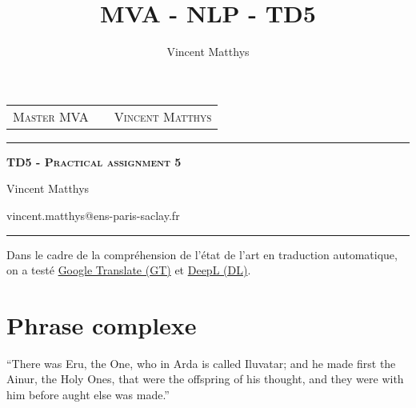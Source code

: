 \documentclass[12pt,a4paper,onecolumn]{article}
\title{MVA - NLP - TD5}
\author{Vincent Matthys}
\begin{document}
\begin{tabularx}{0.9\textwidth}{@{} l X r @{} }
	{\textsc{Master MVA}}  &  & \textsc{Vincent Matthys} \\
\end{tabularx}
\begin{center}

	\rule[11pt]{5cm}{0.5pt}

	\textbf{\LARGE \textsc{TD5 - Practical assignment 5}}

	Vincent Matthys

	vincent.matthys@ens-paris-saclay.fr

	\rule{5cm}{0.5pt}

\end{center}


Dans le cadre de la compréhension de l'état de l'art en traduction automatique, on a testé \href{https://translate.google.fr/m/translate}{Google Translate (GT)} et \href{https://www.deepl.com/translator}{DeepL (DL)}.

\section{Phrase complexe}

\enquote{There was Eru, the One, who in Arda is called Iluvatar; and he made first the Ainur, the Holy Ones, that were the offspring of his thought, and they were with him before aught else was made.}
\end{document}
